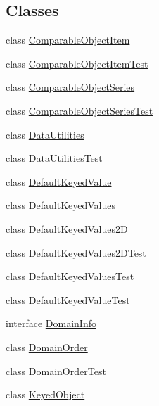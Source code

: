 \subsection*{Classes}
\begin{DoxyCompactItemize}
\item 
class \mbox{\hyperlink{classorg_1_1jfree_1_1data_1_1_comparable_object_item}{Comparable\+Object\+Item}}
\item 
class \mbox{\hyperlink{classorg_1_1jfree_1_1data_1_1_comparable_object_item_test}{Comparable\+Object\+Item\+Test}}
\item 
class \mbox{\hyperlink{classorg_1_1jfree_1_1data_1_1_comparable_object_series}{Comparable\+Object\+Series}}
\item 
class \mbox{\hyperlink{classorg_1_1jfree_1_1data_1_1_comparable_object_series_test}{Comparable\+Object\+Series\+Test}}
\item 
class \mbox{\hyperlink{classorg_1_1jfree_1_1data_1_1_data_utilities}{Data\+Utilities}}
\item 
class \mbox{\hyperlink{classorg_1_1jfree_1_1data_1_1_data_utilities_test}{Data\+Utilities\+Test}}
\item 
class \mbox{\hyperlink{classorg_1_1jfree_1_1data_1_1_default_keyed_value}{Default\+Keyed\+Value}}
\item 
class \mbox{\hyperlink{classorg_1_1jfree_1_1data_1_1_default_keyed_values}{Default\+Keyed\+Values}}
\item 
class \mbox{\hyperlink{classorg_1_1jfree_1_1data_1_1_default_keyed_values2_d}{Default\+Keyed\+Values2D}}
\item 
class \mbox{\hyperlink{classorg_1_1jfree_1_1data_1_1_default_keyed_values2_d_test}{Default\+Keyed\+Values2\+D\+Test}}
\item 
class \mbox{\hyperlink{classorg_1_1jfree_1_1data_1_1_default_keyed_values_test}{Default\+Keyed\+Values\+Test}}
\item 
class \mbox{\hyperlink{classorg_1_1jfree_1_1data_1_1_default_keyed_value_test}{Default\+Keyed\+Value\+Test}}
\item 
interface \mbox{\hyperlink{interfaceorg_1_1jfree_1_1data_1_1_domain_info}{Domain\+Info}}
\item 
class \mbox{\hyperlink{classorg_1_1jfree_1_1data_1_1_domain_order}{Domain\+Order}}
\item 
class \mbox{\hyperlink{classorg_1_1jfree_1_1data_1_1_domain_order_test}{Domain\+Order\+Test}}
\item 
class \mbox{\hyperlink{classorg_1_1jfree_1_1data_1_1_keyed_object}{Keyed\+Object}}

\end{DoxyCompactItemize}
